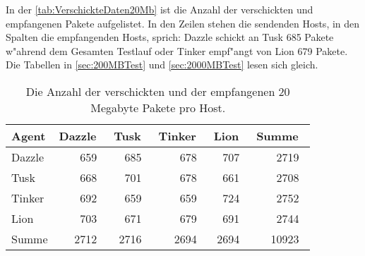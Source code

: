In der \cref{tab:VerschickteDaten20Mb} ist die Anzahl der verschickten und empfangenen Pakete aufgelistet. %
In den Zeilen stehen die sendenden Hosts, in den Spalten die empfangenden Hosts, sprich: \mbox{Dazzle} schickt %
an Tusk 685 Pakete w"ahrend dem Gesamten Testlauf oder Tinker empf"angt von Lion 679 Pakete. %
Die Tabellen in \cref{sec:200MBTest} und \cref{sec:2000MBTest} lesen sich gleich. %


\begin{table}
\centering
\begin{tabular}{l%
 r<{\,}%
 r<{\,}%
 r<{\,}%
 r<{\,}%
 r<{\,}%
}
Agent  				& Dazzle	& Tusk		& Tinker	& Lion		& Summe		\\
\hline
Dazzle 				& 659		& 685		& 678		& 707		& 2719		\\
Tusk 				& 668		& 701		& 678		& 661		& 2708		\\
Tinker				& 692		& 659		& 659		& 724		& 2752		\\
Lion				& 703		& 671		& 679		& 691		& 2744		\\ 
Summe				& 2712		& 2716		& 2694 		& 2694		& 10923		\\
\end{tabular}
\caption{Die Anzahl der verschickten und der empfangenen 20 Megabyte Pakete pro Host.}
\label{tab:VerschicktePakete20Mb}
\end{table}




























